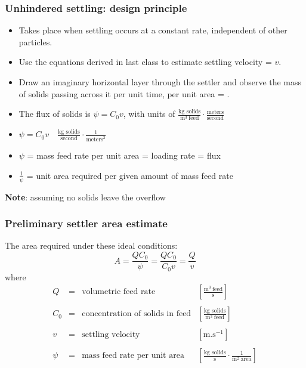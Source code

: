 \begin{frame}\frametitle{Unhindered settling: design principle}
	\begin{itemize}
		\item	Takes place when settling occurs at a constant rate, independent of other particles.
		\item	Use the equations derived in last class to estimate settling velocity = $v$.
		\item	Draw an imaginary horizontal layer through the settler and observe the mass of solids passing across it per unit time, per unit area = {\color{purple}{mass flux}}.
		\item	The flux of solids is $\psi = C_0 v$, with units of $\displaystyle \frac{\text{kg solids}}{\text{m}^3~\text{feed}} \cdot \frac{\text{meters}}{\text{second}}$
		\item	$ \psi = C_0 v \quad \displaystyle \frac{\text{kg solids}}{\text{second}} \cdot \frac{1}{\text{meters}^2}$
		\item	$\psi$ = mass feed rate per unit area = {\color{purple}loading rate} = flux
		\item	$\displaystyle \frac{1}{\psi}$ = unit area required per given amount of mass feed rate
	\end{itemize}
	\textbf{Note}: assuming no solids leave the overflow
\end{frame}

\begin{frame}\frametitle{Preliminary settler area estimate}
	The area required under these ideal conditions:
	\[
		A = \displaystyle \frac{Q C_0}{\psi} = \displaystyle \frac{Q C_0}{C_0 v} = \displaystyle \frac{Q}{v}
	\]
	where
	\[
	\begin{array}{rcll}
		Q		&=& \text{volumetric feed rate}              &\left[\displaystyle \frac{\text{m}^3~\text{feed}}{\text{s}}\right]\\
		\\
		C_0 	&=& \text{concentration of solids in feed}   &\left[\displaystyle\frac{\text{kg solids}}{\text{m}^{3}~\text{feed}}\right]\\
		\\
		v  		&=& \text{settling velocity} 				 &\left[ \text{m.s}^{-1}\right] \\
		\\
		\psi    &=& \text{mass feed rate per unit area}		 &\left[\displaystyle \frac{\text{kg solids}}{\text{s}} \cdot \frac{1}{\text{m}^2~\text{area}}\right]
	\end{array}
	\]
\end{frame}


